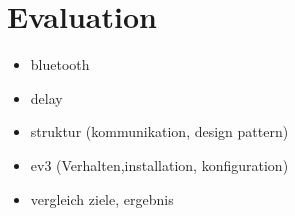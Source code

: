 \section{Evaluation}

\begin{itemize}
	\item bluetooth
	\item delay
	\item struktur (kommunikation, design pattern)
	\item ev3 (Verhalten,installation, konfiguration)
	\item vergleich ziele, ergebnis
\end{itemize}